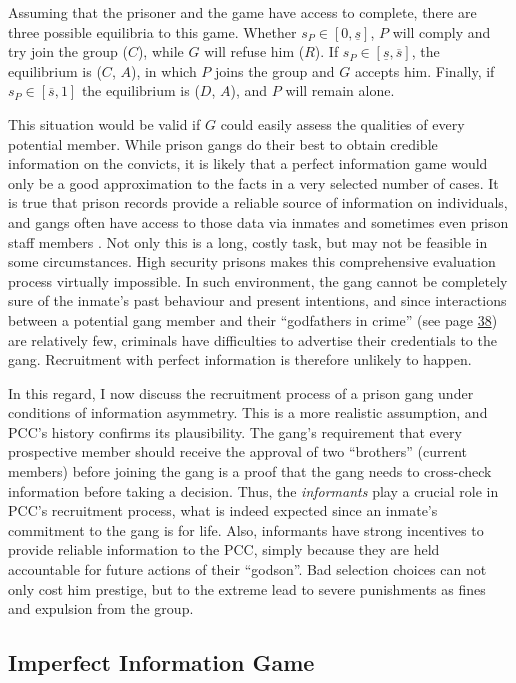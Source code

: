 Assuming that the prisoner and the game have access to complete, there are three possible equilibria to this game. Whether $s_P \in \left[0, \underline{s} \right]$, $P$ will comply and try join the group ($C$), while $G$ will refuse him ($R$). If $s_P \in \left[\underline{s}, \overline{s} \right]$, the equilibrium is ($C$, $A$), in which $P$ joins the group and $G$ accepts him. Finally, if $s_P \in \left[\overline{s}, 1 \right]$ the equilibrium is ($D$, $A$), and $P$ will remain alone. 

This situation would be valid if $G$ could easily assess the qualities of every potential member. While prison gangs do their best to obtain credible information on the convicts, it is likely that a perfect information game would only be a good approximation to the facts in a very selected number of cases. It is true that prison records provide a reliable source of information on individuals, and gangs often have access to those data via inmates and sometimes even prison staff members \citep[]{gambetta2009codes}. Not only this is a long, costly task, but may not be feasible in some circumstances. High security prisons makes this comprehensive evaluation process virtually impossible. In such environment, the gang cannot be completely sure of the inmate's past behaviour and present intentions, and since interactions between a potential gang member and their ``godfathers in crime'' (see page \hyperlink{page.38}{38}) are relatively few, criminals have difficulties to advertise their credentials to the gang. Recruitment with perfect information is therefore unlikely to happen.

In this regard, I now discuss the recruitment process of a prison gang under conditions of information asymmetry. This is a more realistic assumption, and PCC's history confirms its plausibility. The gang's requirement that every prospective member should receive the approval of two ``brothers'' (current members) before joining the gang is a proof that the gang needs to cross-check information before taking a decision. Thus, the \textit{informants} play a crucial role in PCC's recruitment process, what is indeed expected since an inmate's commitment to the gang is for life. Also, informants have strong incentives to provide reliable information to the PCC, simply because they are held accountable for future actions of their ``godson''. Bad selection choices can not only cost him prestige, but to the extreme lead to severe punishments as fines and expulsion from the group. 

\subsection{Imperfect Information Game}

